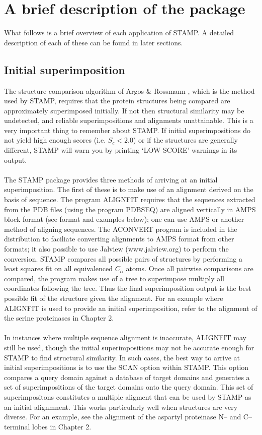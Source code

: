 \section{A brief description of the package}

What follows is a brief overview of each application of STAMP.  A
detailed description of each of these can be found in later
sections.

\subsection{Initial superimposition}

The structure comparison algorithm of Argos \& Rossmann
\cite{argos76}, which is the method used by STAMP, requires that the 
protein structures being compared are approximately superimposed 
initially.  If not then structural similarity may be undetected, and 
reliable superimpositions and alignments unattainable.  This is a very important
thing to remember about STAMP.  If initial superimpositions do not yield high
enough scores (i.e. $S_{c} < 2.0$) or if the structures are generally different, 
STAMP will warn you by printing `LOW SCORE' warnings in its output.\\
\\
The STAMP package provides three methods of arriving at an initial 
superimposition.  The first of these is to make use of an alignment
derived on the basis of sequence.  The program ALIGNFIT requires
that the sequences extracted from the PDB files (using the program
PDBSEQ) are aligned vertically in AMPS block format (see format and
examples below); one can use AMPS or another method of aligning sequences.
The ACONVERT program is included in the distribution to faciliate converting
alignments to AMPS format from other formats; it also possible to use
Jalview (www.jalview.org) to perform the conversion.
STAMP compares all possible pairs of
structures by performing a least squares fit on all equivalenced 
$C_{\alpha}$ atoms.  Once all pairwise comparisons are compared, the
program makes use of a tree to superimpose  multiply all
coordinates following the tree.  Thus the final superimposition
output is the best possible fit of the structure given the
alignment.  For an example where ALIGNFIT is used to provide an
initial superimposition, refer to the alignment of the serine
proteinases in Chapter 2.\\
\\
In instances where multiple sequence alignment is inaccurate,
ALIGNFIT may still be used, though the initial superimpositions may
not be accurate enough for STAMP to find structural similarity. 
In such cases,  the best way to arrive at initial superimpositions is to use
the SCAN option within STAMP. This option compares a query domain
against a database of target domains and generates a set of
superimpositions of the target domains onto the query domain.  
This set of superimpositons constitutes a multiple aligment
that can be used by STAMP as an initial alignmnent.  This works particularly well when structures are very diverse.  For an
example, see the alignment of the aspartyl proteinase N-- and C--
terminal lobes in Chapter 2.

